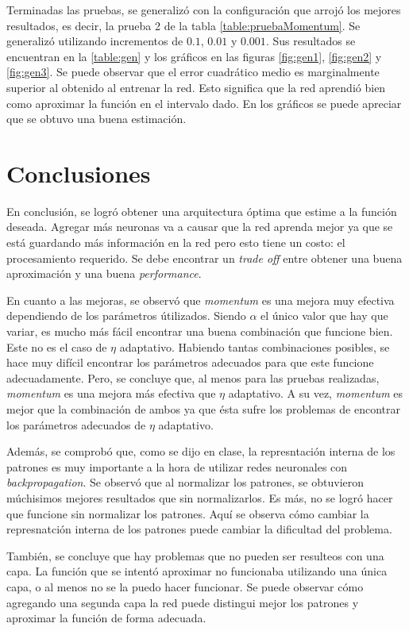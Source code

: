 \documentclass[11pt,a4paper]{article}
\begin{document}
Terminadas las pruebas, se generalizó con la configuración que arrojó los mejores resultados, es decir, la prueba 2 de la tabla \ref{table:pruebaMomentum}. Se generalizó utilizando incrementos de $0.1$, $0.01$ y $0.001$. Sus resultados se encuentran en la \ref{table:gen} y los gráficos en las figuras \ref{fig:gen1}, \ref{fig:gen2} y \ref{fig:gen3}. Se puede observar que el error cuadrático medio es marginalmente superior al obtenido al entrenar la red. Esto significa que la red aprendió bien como aproximar la función en el intervalo dado. En los gráficos se puede apreciar que se obtuvo una buena estimación. 

\section{Conclusiones}

En conclusión, se logró obtener una arquitectura óptima que estime a la función deseada. Agregar más neuronas va a causar que la red aprenda mejor ya que se está guardando más información en la red pero esto tiene un costo: el procesamiento requerido. Se debe encontrar un \emph{trade off} entre obtener una buena aproximación y una buena \emph{performance}.

En cuanto a las mejoras, se observó que \emph{momentum} es una mejora muy efectiva dependiendo de los parámetros útilizados. Siendo $\alpha$ el único valor que hay que variar, es mucho más fácil encontrar una buena combinación que funcione bien. Este no es el caso de $\eta$ adaptativo. Habiendo tantas combinaciones posibles, se hace muy difícil encontrar los parámetros adecuados para que este funcione adecuadamente. Pero, se concluye que, al menos para las pruebas realizadas, \emph{momentum} es una mejora más efectiva que $\eta$ adaptativo. A su vez, \emph{momentum} es mejor que la combinación de ambos ya que ésta sufre los problemas de encontrar los parámetros adecuados de $\eta$ adaptativo.

Además, se comprobó que, como se dijo en clase, la represntación interna de los patrones es muy importante a la hora de utilizar redes neuronales con \emph{backpropagation}. Se observó que al normalizar los patrones, se obtuvieron múchisimos mejores resultados que sin normalizarlos. Es más, no se logró hacer que funcione sin normalizar los patrones. Aquí se observa cómo cambiar la represnatción interna de los patrones puede cambiar la dificultad del problema.

También, se concluye que hay problemas que no pueden ser resulteos con una capa. La función que se intentó aproximar no funcionaba utilizando una única capa, o al menos no se la puedo hacer funcionar. Se puede observar cómo agregando una segunda capa la red puede distingui mejor los patrones y aproximar la función de forma adecuada.
 
\end{document}
